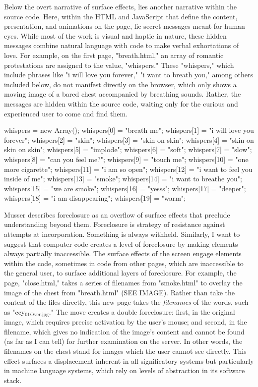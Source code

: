 \documentclass[11pt]{article}
\begin{document}
\begin{enumerate}
Below the overt narrative of surface effects, lies another narrative
within the source code. Here, within the HTML and JavaScript that
define the content, presentation, and animations on the page, lie
secret messages meant for human eyes. While most of the work is visual
and haptic in nature, these hidden messages combine natural language
with code to make verbal exhortations of love. For example, on the
first page, "breath.html," an array of romantic protestations are
assigned to the value, "whispers." These "whispers," which include
phrases like "i will love you forever," "i want to breath you," among
others included below, do not manifest directly on the browser, which
only shows a moving image of a bared chest accompanied by breathing
sounds. Rather, the messages are hidden within the source code,
waiting only for the curious and experienced user to come and find
them.
\begin{SOURCE}
whispers = new Array();
whispers[0] = "breath me";
whispers[1] = "i will love you forever";
whispers[2] = "skin";
whispers[3] = "skin on skin";
whispers[4] = "skin on skin on skin";
whispers[5] = "implode";
whispers[6] = "soft";
whispers[7] = "slow";
whispers[8] = "can you feel me?";
whispers[9] = "touch me";
whispers[10] = "one more cigarette";
whispers[11] = "i am so open";
whispers[12] = "i want to feel you inside of me";
whispers[13] = "smoke";
whispers[14] = "i want to breathe you";
whispers[15] = "we are smoke";
whispers[16] = "yesss";
whispers[17] = "deeper";
whispers[18] = "i am disappearing";
whispers[19] = "warm";
\end{SOURCE}

Musser describes foreclosure as an overflow of surface effects that
preclude understanding beyond them. Foreclosure is strategy of
resistance against attempts at incorporation. Something is always
withheld. Similarly, I want to suggest that computer code creates a
level of foreclosure by making elements always partially
inaccessible. The surface effects of the screen engage elements within
the code, sometimes in code from other pages, which are inaccessible
to the general user, to surface additional layers of foreclosure. For
example, the page, "close.html," takes a series of filenames from
"smoke.html" to overlay the image of the chest from "breath.html" (SEE
IMAGE). Rather than take the content of the files directly, this new
page takes the \emph{filenames} of the words, such as "ccy\(_{\text{01}}\)\(_{\text{Over.jpg}}\)."
The move creates a double foreclosure: first, in the original image,
which requires precise activation by the user's mouse; and second, in
the filename, which gives no indication of the image's content and
cannot be found (as far as I can tell) for further examination on the
server. In other words, the filenames on the chest stand for images
which the user cannot see directly. This effect surfaces a
displacement inherent in all significatory systems but particularly in
machine language systems, which rely on levels of abstraction in its
software stack.


\end{enumerate}
\end{document}
